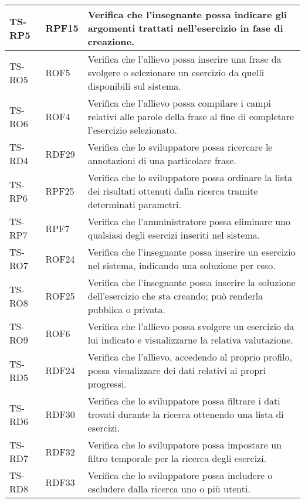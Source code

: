 \begin{longtable}{|>{\centering\arraybackslash}m{1.6cm}|>{\centering\arraybackslash}m{1.7cm}|m{6.41cm}|}
		\rowcolor{LightGray}
		TS-RP5		
		& RPF15 
		& Verifica che l'insegnante possa indicare gli argomenti trattati nell'esercizio in fase di creazione.
		\\ \hline
		\rowcolor{white}
		TS-RO5		
		& ROF5 
		& Verifica che l'allievo possa inserire una frase da svolgere o selezionare un esercizio da quelli disponibili sul sistema.
		\\ \hline
		\rowcolor{LightGray}
		TS-RO6		
		& ROF4 
		& Verifica che l'allievo possa compilare i campi relativi alle parole della frase al fine di completare l'esercizio selezionato.
		\\ \hline
		\rowcolor{white}
		TS-RD4		
		& RDF29
		& Verifica che lo sviluppatore possa ricercare le annotazioni di una particolare frase.
		\\ \hline
		\rowcolor{LightGray}
		TS-RP6		
		& RPF25 
		& Verifica che lo sviluppatore possa ordinare la lista dei risultati ottenuti dalla ricerca tramite determinati parametri. 
		\\ \hline
		\rowcolor{white}
		TS-RP7		
		& RPF7 
		& Verifica che l'amministratore possa eliminare uno qualsiasi degli esercizi inseriti nel sistema.
		\\ \hline
		\rowcolor{LightGray}
		TS-RO7		
		& ROF24 
		& Verifica che l'insegnante possa inserire un esercizio nel sistema, indicando una soluzione per esso. 
		\\ \hline
		\rowcolor{white}
		TS-RO8		
		& ROF25 
		& Verifica che l'insegnante possa inserire la soluzione dell'esercizio che sta creando; può renderla pubblica o privata. 
		\\ \hline
		\rowcolor{LightGray}
		TS-RO9		
		& ROF6 
		& Verifica che l'allievo possa svolgere un esercizio da lui indicato e visualizzarne la relativa valutazione. 
		\\ \hline
		\rowcolor{white}
		TS-RD5		
		& RDF24 
		& Verifica che l'allievo, accedendo al proprio profilo, possa visualizzare dei dati relativi ai propri progressi. 
		\\ \hline
		\rowcolor{LightGray}
		TS-RD6		
		& RDF30 
		& Verifica che lo sviluppatore possa filtrare i dati trovati durante la ricerca ottenendo una lista di esercizi. 
		\\ \hline
		\rowcolor{white}
		TS-RD7
		& RDF32 
		& Verifica che lo sviluppatore possa impostare un filtro temporale per la ricerca degli esercizi.
		\\ \hline
		\rowcolor{LightGray}
		TS-RD8		
		& RDF33 
		& Verifica che lo sviluppatore possa includere o escludere dalla ricerca uno o più utenti. 

\end{longtable}
